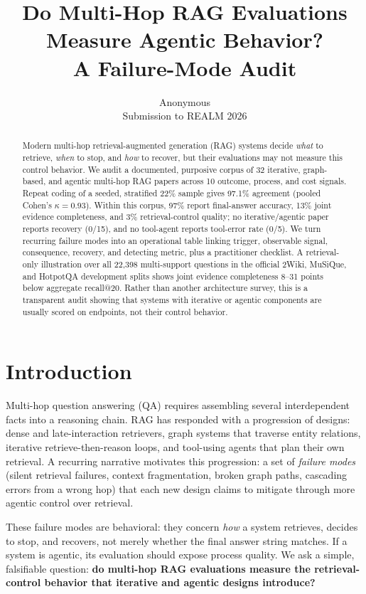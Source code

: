 \documentclass[11pt]{article}
\title{Do Multi-Hop RAG Evaluations Measure Agentic Behavior?\\A Failure-Mode Audit}
\author{Anonymous \\ Submission to REALM 2026}
\begin{document}
\maketitle

\begin{abstract}
Modern multi-hop retrieval-augmented generation (RAG) systems decide \emph{what} to retrieve,
\emph{when} to stop, and \emph{how} to recover, but their evaluations may not measure this control
behavior. We audit a documented, purposive corpus of 32 iterative, graph-based, and agentic multi-hop
RAG papers across 10 outcome, process, and cost signals. Repeat coding of a seeded, stratified 22\%
sample gives 97.1\% agreement (pooled Cohen's $\kappa=0.93$). Within this corpus, 97\% report
final-answer accuracy, 13\% joint evidence completeness, and 3\% retrieval-control quality; no
iterative/agentic paper reports recovery (0/15), and no tool-agent reports tool-error rate (0/5).
We turn recurring failure modes into an operational table linking trigger,
observable signal, consequence, recovery, and detecting metric, plus a practitioner checklist. A
retrieval-only illustration over all 22,398 multi-support questions in the official 2Wiki, MuSiQue,
and HotpotQA development splits shows joint evidence completeness 8--31 points below aggregate
recall@20. Rather than another architecture survey, this is a transparent audit showing that
systems with iterative or agentic components are usually scored on endpoints, not their control behavior.
\end{abstract}

\section{Introduction}
Multi-hop question answering (QA) requires assembling several interdependent facts into a reasoning
chain. RAG has responded with a progression of designs: dense and late-interaction retrievers, graph
systems that traverse entity relations, iterative retrieve-then-reason loops, and tool-using agents
that plan their own retrieval. A recurring narrative motivates this progression: a set of
\emph{failure modes} (silent retrieval failures, context fragmentation, broken graph paths, cascading
errors from a wrong hop) that each new design claims to mitigate through more agentic control over
retrieval.

These failure modes are behavioral: they concern \emph{how} a system retrieves, decides to stop, and
recovers, not merely whether the final answer string matches. If a system is agentic, its evaluation
should expose process quality. We ask a simple, falsifiable question: \textbf{do multi-hop RAG
evaluations measure the retrieval-control behavior that iterative and agentic designs introduce?}
\end{document}

